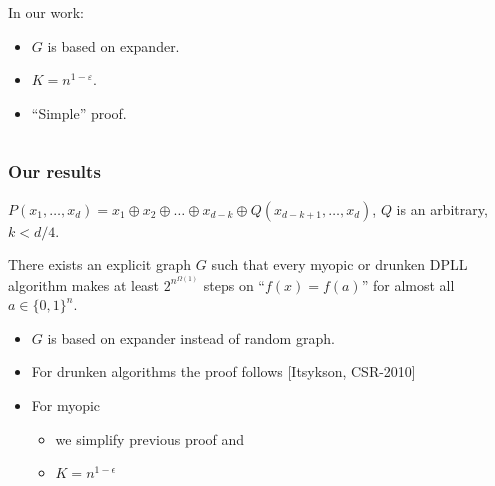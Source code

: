 \begin{frame}
\begin{itemize}
\begin{columns}
                   	\begin{column}{4cm}
                       	In our work:
	            		\pause
       		            \begin{itemize}
	   	            		\item \alert{$G$ is based on expander.}
			            	\pause
       				    	\item \alert{$K = n^{1 - \varepsilon}$.}
           					\pause
			            	\item \alert{``Simple'' proof}.
			            \end{itemize}
                    \end{column}
                \end{columns}
    \end{itemize}
\end{frame}


\begin{frame}
	\frametitle{Our results}

	$P(x_1, \ldots, x_d) = x_1 \oplus x_2 \oplus \ldots \oplus
    x_{d - k} \oplus Q(x_{d - k + 1}, \ldots, x_d)$, $Q$ is an
    arbitrary, $k < d / 4$.

	\pause
	\begin{theorem}
		There exists \alert{an explicit} graph $G$ such that
		every myopic or drunken DPLL algorithm makes at least $2^{n^{\Omega(1)}}$
		steps on ``$f(x) = f(a)$'' for almost all $a \in \{0, 1\}^n$.
	\end{theorem}

    \pause
    \begin{itemize}
	    \item $G$ is based on expander instead of random graph.
    	\pause
	    \item For drunken algorithms the proof follows
    		[Itsykson, CSR-2010] 
    	\pause
	    \item For myopic 
    	\begin{itemize}
 	       \item we simplify previous proof and 
     	   \item $K = n^{1 - \epsilon}$
    	\end{itemize}
    \end{itemize}
\end{frame}

